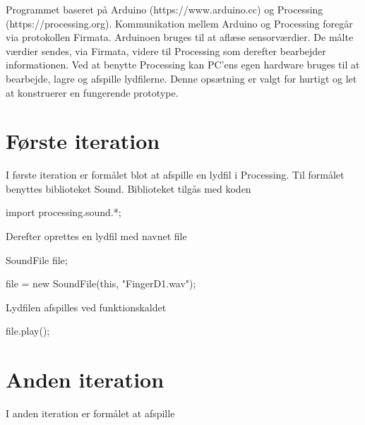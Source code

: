  Programmet baseret på Arduino (https://www.arduino.cc) og Processing (https://processing.org). Kommunikation mellem Arduino og Processing foregår via protokollen Firmata. 
 Arduinoen bruges til at aflæse sensorværdier. De målte værdier sendes, via Firmata, videre til Processing som derefter bearbejder informationen.
 Ved at benytte Processing kan PC'ens egen hardware bruges til at bearbejde, lagre og afspille lydfilerne. Denne opsætning er valgt for hurtigt og let at konstruerer en fungerende prototype. 

\section{Første iteration}
I første iteration er formålet blot at afspille en lydfil i Processing. Til formålet benyttes biblioteket Sound. Biblioteket tilgås med koden
 
import processing.sound.*;

Derefter oprettes en lydfil med navnet file 

SoundFile file;  
 
file = new SoundFile(this, "FingerD1.wav");

Lydfilen afspilles ved funktionskaldet 

file.play();

\section{Anden iteration}
I anden iteration er formålet at afspille 


